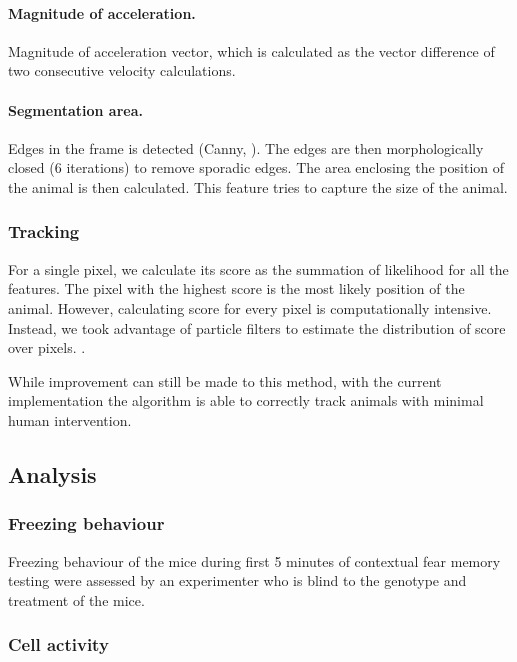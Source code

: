 \paragraph{Magnitude of acceleration.} Magnitude of acceleration vector, which is calculated as the vector difference of two consecutive velocity calculations. 

\paragraph{Segmentation area.} Edges in the frame is detected (Canny, ). The edges are then morphologically closed (6 iterations) to remove sporadic edges. The area enclosing the position of the animal is then calculated. This feature tries to capture the size of the animal.

\subsubsection{Tracking}

For a single pixel, we calculate its score as the summation of likelihood for all the features. The pixel with the highest score is the most likely position of the animal. However, calculating score for every pixel is computationally intensive. Instead, we took advantage of particle filters to estimate the distribution of score over pixels. .

While improvement can still be made to this method, with the current implementation the algorithm is able to correctly track animals with minimal human intervention. 


\subsection{Analysis}

\subsubsection{Freezing behaviour}
Freezing behaviour of the mice during first 5 minutes of contextual fear memory testing were assessed by an experimenter who is blind to the genotype and treatment of the mice. 

\subsubsection{Cell activity}

